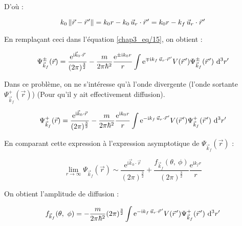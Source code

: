 \documentclass[12pt,a4paper,oneside,french]{book}
\renewcommand{\i}{\mathrm{i}}
\newcommand{\e}{\mathrm{e}}
\newcommand{\diff}{\mathrm{d}}
\newcommand{\pvec}[1]{\vec{#1} \mkern2mu \vphantom{#1}}
\theoremstyle{definition}
\theoremstyle{definition}
\theoremstyle{definition}
\theoremstyle{remark}
\theoremstyle{definition}
\begin{document}
    \bigskip
    
    D'où :
    
    \begin{equation*}
        {k}_{0} \left\lVert\vec{r} - \pvec{r}'\right\rVert = {k}_{0} r - {k}_{0} \, {\vec{u}}_{r} \cdot \pvec{r}'= {k}_{0} r - {k}_{f} \, {\vec{u}}_{r} \cdot \pvec{r}'
    \end{equation*}
    
    En remplaçant ceci dans l'équation \eqref{chap3_eq/15}, on obtient :
    
    \begin{equation*}
        {\Psi}_{{\vec{k}}_{f}}^{\pm}(\vec{r}) = \frac{{\e}^{\i {\vec{k}}_{0} \cdot \vec{r}}}{(2\pi)^{\frac{3}{2}}} - \frac{m}{2\pi {\hbar}^{2}} \frac{{\e}^{\pm\i {k}_{0} r}}{r} \int {\e}^{\mp\i {k}_{f} \, {\vec{u}}_{r} \cdot \pvec{r}'} V(\pvec{r}') {\Psi}_{{\vec{k}}_{f}}^{\pm}(\pvec{r}') \ {\diff}^{3} r'
    \end{equation*}
    
    Dans ce problème, on ne s'intéresse qu'à l'onde divergente (l'onde sortante ${\Psi}_{{\vec{k}}_{f}}^{+}(\vec{r})$) (Pour qu'il y ait effectivement diffusion).
    
    \begin{equation*}
        {\Psi}_{{\vec{k}}_{f}}^{+}(\vec{r}) = \frac{{\e}^{\i {\vec{k}}_{0} \cdot \vec{r}}}{(2\pi)^{\frac{3}{2}}} - \frac{m}{2\pi {\hbar}^{2}} \frac{{\e}^{\i {k}_{0} r}}{r} \int {\e}^{-\i {k}_{f} \, {\vec{u}}_{r} \cdot \pvec{r}'} V(\pvec{r}') {\Psi}_{{\vec{k}}_{f}}^{+}(\pvec{r}') \ {\diff}^{3} r'
    \end{equation*}
    
    En comparant cette expression à l'expression asymptotique de ${\Psi}_{{\vec{k}}_{f}}(\vec{r})$ : 
    
    \begin{equation*}
        \lim_{r \to \infty} {\Psi}_{{\vec{k}}_{f}}(\vec{r}) \sim \frac{{\e}^{\i {\vec{k}}_{0} \cdot \vec{r}}}{(2\pi)^{\frac{3}{2}}} + \frac{{f}_{{\vec{k}}_{f}}(\theta, \ \phi)}{(2\pi)^{\frac{3}{2}}} \frac{{\e}^{\i {k}_{f} r}}{r}
    \end{equation*}
    
    On obtient l'amplitude de diffusion :
    
    \begin{equation*}
        {f}_{{\vec{k}}_{f}}(\theta, \ \phi) = -\frac{m}{2\pi {\hbar}^{2}} (2\pi)^{\frac{3}{2}} \int {\e}^{-\i {k}_{f} \, {\vec{u}}_{r} \cdot \pvec{r}'} V(\pvec{r}') {\Psi}_{{\vec{k}}_{f}}^{+}(\pvec{r}') \ {\diff}^{3} r'
    \end{equation*}
    
\end{document}
